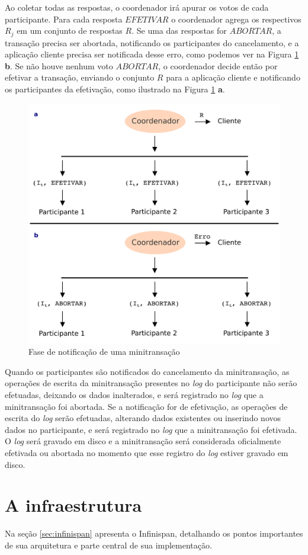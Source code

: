 \documentclass[11pt,twoside,a4paper]{book}
\begin{document}
Ao coletar todas as respostas, o coordenador irá apurar os votos de cada participante. Para cada resposta $EFETIVAR$ o coordenador agrega os respectivos $R_j$ em um conjunto de respostas $R$. Se uma das respostas for $ABORTAR$, a transação precisa ser abortada, notificando os participantes do cancelamento, e a aplicação cliente precisa ser notificada desse erro, como podemos ver na Figura \ref{fig:minitransacao_2fase} \textbf{b}. Se não houve nenhum voto $ABORTAR$, o coordenador decide então por efetivar a transação, enviando o conjunto $R$ para a aplicação cliente e notificando os participantes da efetivação, como ilustrado na Figura \ref{fig:minitransacao_2fase} \textbf{a}.

\begin{figure}
  \centering
  \includegraphics[width=.65\textwidth]{minitransacao_2fase} 
  \caption{Fase de notificação de uma minitransação}
  \label{fig:minitransacao_2fase} 
\end{figure}

Quando os participantes são notificados do cancelamento da minitransação, as operações de escrita da minitransação presentes no \emph{log} do participante não serão efetuadas, deixando os dados inalterados, e será registrado no \emph{log} que a minitransação foi abortada. Se a notificação for de efetivação, as operações de escrita do \emph{log} serão efetuadas, alterando dados existentes ou inserindo novos dados no participante, e será registrado no \emph{log} que a minitransação foi efetivada. O \emph{log} será gravado em disco e a minitransação será considerada oficialmente efetivada ou abortada no momento que esse registro do \emph{log} estiver gravado em disco.

\chapter{A infraestrutura}
\label{chap:implementacao}
Na seção \ref{sec:infinispan} apresenta o Infinispan, detalhando os pontos importantes de sua arquitetura e parte central de sua implementação. 
\end{document}
